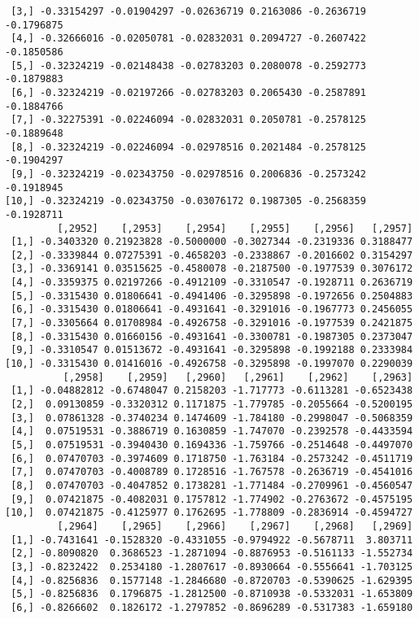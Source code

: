 \documentclass[
  letterpaper,
  DIV=11,
  numbers=noendperiod]{scrreprt}
\begin{document}
\begin{verbatim}
 [3,] -0.33154297 -0.01904297 -0.02636719 0.2163086 -0.2636719 -0.1796875
 [4,] -0.32666016 -0.02050781 -0.02832031 0.2094727 -0.2607422 -0.1850586
 [5,] -0.32324219 -0.02148438 -0.02783203 0.2080078 -0.2592773 -0.1879883
 [6,] -0.32324219 -0.02197266 -0.02783203 0.2065430 -0.2587891 -0.1884766
 [7,] -0.32275391 -0.02246094 -0.02832031 0.2050781 -0.2578125 -0.1889648
 [8,] -0.32324219 -0.02246094 -0.02978516 0.2021484 -0.2578125 -0.1904297
 [9,] -0.32324219 -0.02343750 -0.02978516 0.2006836 -0.2573242 -0.1918945
[10,] -0.32324219 -0.02343750 -0.03076172 0.1987305 -0.2568359 -0.1928711
         [,2952]    [,2953]    [,2954]    [,2955]    [,2956]   [,2957]
 [1,] -0.3403320 0.21923828 -0.5000000 -0.3027344 -0.2319336 0.3188477
 [2,] -0.3339844 0.07275391 -0.4658203 -0.2338867 -0.2016602 0.3154297
 [3,] -0.3369141 0.03515625 -0.4580078 -0.2187500 -0.1977539 0.3076172
 [4,] -0.3359375 0.02197266 -0.4912109 -0.3310547 -0.1928711 0.2636719
 [5,] -0.3315430 0.01806641 -0.4941406 -0.3295898 -0.1972656 0.2504883
 [6,] -0.3315430 0.01806641 -0.4931641 -0.3291016 -0.1967773 0.2456055
 [7,] -0.3305664 0.01708984 -0.4926758 -0.3291016 -0.1977539 0.2421875
 [8,] -0.3315430 0.01660156 -0.4931641 -0.3300781 -0.1987305 0.2373047
 [9,] -0.3310547 0.01513672 -0.4931641 -0.3295898 -0.1992188 0.2333984
[10,] -0.3315430 0.01416016 -0.4926758 -0.3295898 -0.1997070 0.2290039
          [,2958]    [,2959]   [,2960]   [,2961]    [,2962]    [,2963]
 [1,] -0.04882812 -0.6748047 0.2158203 -1.717773 -0.6113281 -0.6523438
 [2,]  0.09130859 -0.3320312 0.1171875 -1.779785 -0.2055664 -0.5200195
 [3,]  0.07861328 -0.3740234 0.1474609 -1.784180 -0.2998047 -0.5068359
 [4,]  0.07519531 -0.3886719 0.1630859 -1.747070 -0.2392578 -0.4433594
 [5,]  0.07519531 -0.3940430 0.1694336 -1.759766 -0.2514648 -0.4497070
 [6,]  0.07470703 -0.3974609 0.1718750 -1.763184 -0.2573242 -0.4511719
 [7,]  0.07470703 -0.4008789 0.1728516 -1.767578 -0.2636719 -0.4541016
 [8,]  0.07470703 -0.4047852 0.1738281 -1.771484 -0.2709961 -0.4560547
 [9,]  0.07421875 -0.4082031 0.1757812 -1.774902 -0.2763672 -0.4575195
[10,]  0.07421875 -0.4125977 0.1762695 -1.778809 -0.2836914 -0.4594727
         [,2964]    [,2965]    [,2966]    [,2967]    [,2968]   [,2969]
 [1,] -0.7431641 -0.1528320 -0.4331055 -0.9794922 -0.5678711  3.803711
 [2,] -0.8090820  0.3686523 -1.2871094 -0.8876953 -0.5161133 -1.552734
 [3,] -0.8232422  0.2534180 -1.2807617 -0.8930664 -0.5556641 -1.703125
 [4,] -0.8256836  0.1577148 -1.2846680 -0.8720703 -0.5390625 -1.629395
 [5,] -0.8256836  0.1796875 -1.2812500 -0.8710938 -0.5332031 -1.653809
 [6,] -0.8266602  0.1826172 -1.2797852 -0.8696289 -0.5317383 -1.659180

\end{verbatim}
\end{document}
